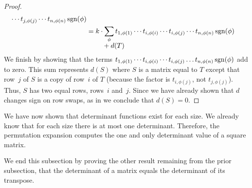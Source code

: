 \begin{proof}
\begin{align*}
\begin{aligned}[t]
            \cdots t_{j,\phi(j)}\cdots t_{n,\phi(n)}
                                 \operatorname{sgn}(\phi)        
     \end{aligned}                                               \\
  &=\begin{aligned}[t]
       &k\cdot \sum_{\smash{\phi}}
            t_{1,\phi(1)}\cdots t_{i,\phi(i)}
            \cdots t_{i,\phi(j)}\cdots t_{n,\phi(n)}
                                 \operatorname{sgn}(\phi)          \\[-.75ex]
       &\hbox{}\quad\hbox{}
             +d(T)          
     \end{aligned}
\end{align*}
We finish by showing that the terms
\( t_{1,\phi(1)}\cdots t_{i,\phi(i)} \cdots t_{i,\phi(j)}\dots t_{n,\phi(n)}
   \operatorname{sgn}(\phi)  \) add to zero.
This sum represents \( d(S) \) where \( S \) is a matrix equal to  \( T \)
except that row~$j$ of $S$ is a copy of row~$i$ of $T$ 
(because the factor is \( t_{i,\phi(j)} \), not \( t_{j,\phi(j)} \)).
Thus, $S$ has two equal rows, rows~$i$ and~$j$.
Since we have already shown that $d$ changes sign on row swaps,
as in  we conclude that $d(S)=0$.
\end{proof}

We have now shown that determinant functions exist for each size.
We already know that for each size there is at most one
determinant.
Therefore, the permutation expansion
computes the one and only determinant value of a square matrix.

We end this subsection by proving the other result 
remaining from the prior subsection, that the determinant of a matrix
equals the determinant of its transpose.


